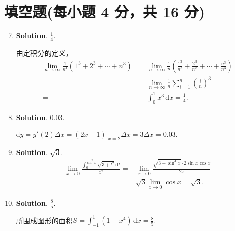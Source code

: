 \documentclass[../main.tex]{subfiles}
\begin{document}
\section{填空题(每小题 4 分，共 16 分)}
\begin{enumerate}
    \setcounter{enumi}{6}
    \item \textbf{Solution}. $\frac{1}{4}$.

          由定积分的定义，
          \[
              \begin{aligned}
                  \lim_{n\to\infty}\frac{1}{n^4}\left(1^{3}+2^{3}+\cdots+n^{3}\right) = {} & \lim_{n\to\infty}\frac{1}{n}\left(\frac{1^3}{n^3}+\frac{2^3}{n^3}+\cdots+\frac{n^3}{n^3}\right) \\
                  = {}                                                                     & \lim_{n\to\infty}\frac{1}{n}\sum_{i=1}^{n}\left(\frac{i}{n}\right)^{3}                          \\
                  = {}                                                                     & \int_{0}^{1}x^{3}\,\mathrm{d}x = \frac{1}{4}.
              \end{aligned}
          \]

    \item \textbf{Solution}. $0.03$.

          $\mathrm{d}y=y'(2)\Delta x = (2x-1)\bigg|_{x=2}\Delta x=3\Delta x=0.03$.

    \item \textbf{Solution}. $\sqrt{3}$.
          \[
              \begin{aligned}
                  \lim_{x\to0}\frac{\displaystyle\int_{0}^{\sin^2 x}\sqrt{3+t^2}\,\mathrm{d}t}{x^2}= {} & \lim_{x\to0}\frac{\sqrt{3+\sin ^4 x}\cdot 2\sin x\cos x}{2x} \\
                  = {}                                                                                  & \sqrt{3}\lim_{x\to0}\cos x = \sqrt{3}.
              \end{aligned}
          \]

    \item \textbf{Solution}. $\frac{8}{5}$.

          所围成图形的面积$S=\int_{-1}^{1}\left(1-x^{4}\right)\,\mathrm{d}x = \frac{8}{5}$.
\end{enumerate}
\end{document}

